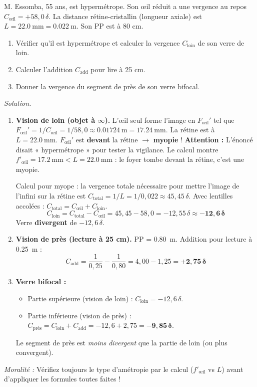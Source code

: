 \documentclass[11pt]{article}
\begin{document}
\begin{exoresolu}
M. Essomba, 55 ans, est hypermétrope. Son œil réduit a une vergence au repos $C_{\text{œil}} = +58,0\,\delta$. La distance rétine-cristallin (longueur axiale) est $L = \SI{22,0}{\milli\meter} = \SI{0,022}{\meter}$. Son PP est à 80 cm.
\begin{enumerate}
    \item Vérifier qu'il est hypermétrope et calculer la vergence $C_{\text{loin}}$ de son verre de loin.
    \item Calculer l'addition $C_{\text{add}}$ pour lire à 25 cm.
    \item Donner la vergence du segment de près de son verre bifocal.
\end{enumerate}
\tcblower
\emph{Solution.}
\begin{enumerate}
    \item \textbf{Vision de loin (objet à $\infty$).} L'œil seul forme l'image en $F_{\text{œil}}'$ tel que $F_{\text{œil}}' = 1/C_{\text{œil}} = 1/58,0 \approx \SI{0,01724}{\meter} = \SI{17,24}{\milli\meter}$.
    La rétine est à $L = \SI{22,0}{\milli\meter}$. $F_{\text{œil}}'$ est \textbf{devant} la rétine $\rightarrow$ \textbf{myopie} !
    \textbf{Attention :} L'énoncé disait « hypermétrope » pour tester la vigilance. Le calcul montre $f'_{\text{œil}} = \SI{17,2}{\milli\meter} < L = \SI{22,0}{\milli\meter}$ : le foyer tombe devant la rétine, c'est une myopie.
    
    Calcul pour myope : la vergence totale nécessaire pour mettre l'image de l'infini sur la rétine est $C_{\text{total}} = 1/L = 1/0,022 \approx 45,45\,\delta$.
    Avec lentilles accolées : $C_{\text{total}} = C_{\text{œil}} + C_{\text{loin}}$.
    \[
    C_{\text{loin}} = C_{\text{total}} - C_{\text{œil}} = 45,45 - 58,0 = -12,55\,\delta \approx \mathbf{-12,6\,\delta}
    \]
    Verre \textbf{divergent} de $-12,6\,\delta$.
    
    \item \textbf{Vision de près (lecture à 25 cm).} PP = \SI{0,80}{\meter}. Addition pour lecture à \SI{0,25}{\meter} :
    \[
    C_{\text{add}} = \frac{1}{0,25} - \frac{1}{0,80} = 4,00 - 1,25 = \mathbf{+2,75\,\delta}
    \]
    
    \item \textbf{Verre bifocal :}
    \begin{itemize}
        \item Partie supérieure (vision de loin) : $C_{\text{loin}} = -12,6\,\delta$.
        \item Partie inférieure (vision de près) : $C_{\text{près}} = C_{\text{loin}} + C_{\text{add}} = -12,6 + 2,75 = \mathbf{-9,85\,\delta}$.
    \end{itemize}
    Le segment de près est \emph{moins divergent} que la partie de loin (ou plus convergent).
\end{enumerate}
\emph{Moralité :} Vérifiez toujours le type d'amétropie par le calcul ($f'_{\text{œil}}$ vs $L$) avant d'appliquer les formules toutes faites !
\end{exoresolu}
\end{document}
